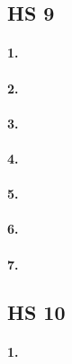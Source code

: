 \documentclass[
]{article}
\begin{document}
\hypertarget{hs-9}{%
\subsection{HS 9}\label{hs-9}}

\hypertarget{section-35}{%
\paragraph{\texorpdfstring{\textbf{1.}}{1.}}\label{section-35}}

\hypertarget{section-36}{%
\paragraph{\texorpdfstring{\textbf{2.}}{2.}}\label{section-36}}

\hypertarget{section-37}{%
\paragraph{\texorpdfstring{\textbf{3.}}{3.}}\label{section-37}}

\hypertarget{section-38}{%
\paragraph{\texorpdfstring{\textbf{4.}}{4.}}\label{section-38}}

\hypertarget{section-39}{%
\paragraph{\texorpdfstring{\textbf{5.}}{5.}}\label{section-39}}

\hypertarget{section-40}{%
\paragraph{\texorpdfstring{\textbf{6.}}{6.}}\label{section-40}}

\hypertarget{section-41}{%
\paragraph{\texorpdfstring{\textbf{7.}}{7.}}\label{section-41}}

\hypertarget{hs-10}{%
\subsection{HS 10}\label{hs-10}}

\hypertarget{section-42}{%
\paragraph{\texorpdfstring{\textbf{1.}}{1.}}\label{section-42}}
\end{document}
